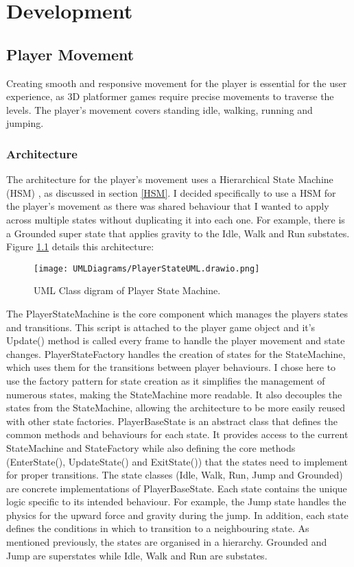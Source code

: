 \documentclass[]{final_report}
\begin{document}
\chapter{Development}
\section{Player Movement}
Creating smooth and responsive movement for the player is essential for the user experience, as 3D platformer games require precise movements to traverse the levels. The player's movement covers standing idle, walking, running and jumping. 
\subsection{Architecture}
The architecture for the player's movement uses a Hierarchical State Machine (HSM) , as discussed in section \ref{HSM}.  I decided specifically to use a HSM for the player's movement as there was shared behaviour that I wanted to apply across multiple states without duplicating it into each one. For example, there is a Grounded super state that applies gravity to the Idle, Walk and Run substates. Figure \ref{fig:label_State} details this architecture:
\begin{figure}[h!]
    \centering
    \texttt{[image: UMLDiagrams/PlayerStateUML.drawio.png]}
    \caption{UML Class digram of Player State Machine.}
    \label{fig:label_State}
\end{figure}
\newline The PlayerStateMachine is the core component which manages the players states and transitions. This script is attached to the player game object and it's Update() method is called every frame to handle the player movement and state changes. PlayerStateFactory handles the creation of states for the StateMachine, which uses them for the transitions between player behaviours. I chose here to use the factory pattern for state creation as it simplifies the management of numerous states, making the StateMachine more readable. It also decouples the states from the StateMachine, allowing the architecture to be more easily reused with other state factories. PlayerBaseState is an abstract class that defines the common methods and behaviours for each state.  It provides access to the current StateMachine and StateFactory while also defining the core methods (EnterState(), UpdateState() and ExitState()) that the states need to implement for proper transitions. The state classes (Idle, Walk, Run, Jump and Grounded) are concrete implementations of PlayerBaseState. Each state contains the unique logic specific to its intended behaviour. For example, the Jump state handles the physics for the upward force and gravity during the jump. In addition, each state defines the conditions in which to transition to a neighbouring state. As mentioned previously, the states are organised in a hierarchy. Grounded and Jump are superstates while Idle, Walk and Run are substates. 
\end{document}

